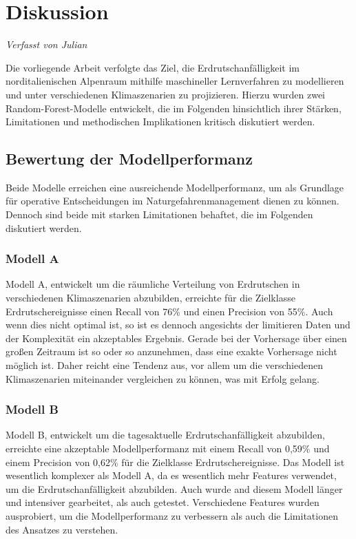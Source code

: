 \documentclass[../main.tex]{subfiles}
\begin{document}
\chapter{Diskussion}
\vspace{-0.5cm}
\noindent\textit{\small Verfasst von Julian}
\vspace{0.5cm}

Die vorliegende Arbeit verfolgte das Ziel, die Erdrutschanfälligkeit im norditalienischen Alpenraum mithilfe maschineller Lernverfahren zu modellieren und unter verschiedenen Klimaszenarien zu projizieren.
Hierzu wurden zwei Random-Forest-Modelle entwickelt, die im Folgenden hinsichtlich ihrer Stärken, Limitationen und methodischen Implikationen kritisch diskutiert werden.

\section{Bewertung der Modellperformanz}
Beide Modelle erreichen eine ausreichende Modellperformanz, um als Grundlage für operative Entscheidungen im Naturgefahrenmanagement dienen zu können. \\

Dennoch sind beide mit starken Limitationen behaftet, die im Folgenden diskutiert werden.

\subsection{Modell A}
Modell A, entwickelt um die räumliche Verteilung von Erdrutschen in verschiedenen Klimaszenarien abzubilden, erreichte für die Zielklasse Erdrutschereignisse einen Recall von 76\% und einen Precision von 55\%.
Auch wenn dies nicht optimal ist, so ist es dennoch angesichts der limitieren Daten und der Komplexität ein akzeptables Ergebnis.
Gerade bei der Vorhersage über einen großen Zeitraum ist so oder so anzunehmen, dass eine exakte Vorhersage nicht möglich ist.
Daher reicht eine Tendenz aus, vor allem um die verschiedenen Klimaszenarien miteinander vergleichen zu können, was mit Erfolg gelang.

\subsection{Modell B}
Modell B, entwickelt um die tagesaktuelle Erdrutschanfälligkeit abzubilden, erreichte eine akzeptable Modellperformanz mit einem Recall von 0,59\% und einem Precision von 0,62\% für die Zielklasse Erdrutschereignisse.
Das Modell ist wesentlich komplexer als Modell A, da es wesentlich mehr Features verwendet, um die Erdrutschanfälligkeit abzubilden.
Auch wurde and diesem Modell länger und intensiver gearbeitet, als auch getestet.
Verschiedene Features wurden ausprobiert, um die Modellperformanz zu verbessern als auch die Limitationen des Ansatzes zu verstehen. \par
\end{document}
